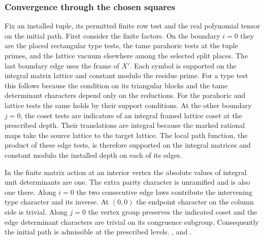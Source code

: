 \subsubsection{Convergence through the chosen squares}

Fix an installed tuple, its permitted finite row test and the real
polynomial tensor on the initial path. First consider the finite
factors. On the boundary \(i=0\) they are the placed rectangular
type tests, the tame parahoric tests at the tuple primes, and the
lattice vacuum elsewhere among the selected split places. The last
boundary edge uses the frame of \(X'\). Each symbol is supported
on the integral matrix lattice and constant modulo the residue
prime. For a type test this follows because the condition on its
triangular blocks and the tame determinant characters depend
only on the reductions. For the parahoric and lattice tests the
same holds by their support conditions. At the other boundary
\(j=0\), the coset tests are indicators of an integral framed
lattice coset at the prescribed depth. Their translations are
integral because the marked rational maps take the source
lattice to the target lattice. The local path function, the
product of these edge tests, is therefore supported on the
integral matrices and constant modulo the installed depth on
each of its edges.

In the finite matrix action at an interior vertex the absolute
values of integral unit determinants are one. The extra parity
character is unramified and is also one there. Along \(i=0\)
the two consecutive edge laws contribute the intervening type
character and its inverse. At \((0,0)\) the endpoint character
on the column side is trivial. Along \(j=0\) the vertex group
preserves the indicated coset and the edge determinant characters
are trivial on its congruence subgroup. Consequently the initial
path is admissible at the prescribed levels.
,
 and
.

